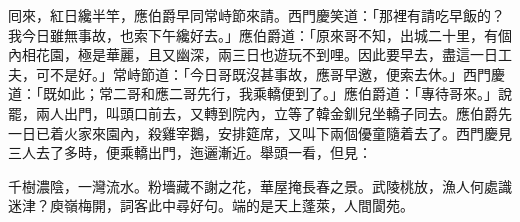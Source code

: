 囘來，紅日纔半竿，應伯爵早同常峙節來請。西門慶笑道：「那裡有請吃早飯的？我今日雖無事故，也索下午纔好去。」應伯爵道：「原來哥不知，出城二十里，有個內相花園，極是華麗，且又幽深，兩三日也遊玩不到哩。因此要早去，盡這一日工夫，可不是好。」常峙節道：「今日哥既沒甚事故，應哥早邀，便索去休。」西門慶道：「既如此；常二哥和應二哥先行，我乘轎便到了。」應伯爵道：「專待哥來。」說罷，兩人出門，叫頭口前去，又轉到院內，立等了韓金釧兒坐轎子同去。應伯爵先一日已着火家來園內，殺雞宰鵝，安排筵席，又叫下兩個優童隨着去了。西門慶見三人去了多時，便乘轎出門，迤邐漸近。舉頭一看，但見：

\begin{myquote}
千樹濃陰，一灣流水。粉墻藏不謝之花，華屋掩長春之景。武陵桃放，漁人何處識迷津？庾嶺梅開，詞客此中尋好句。端的是天上蓬萊，人間閬苑。
\end{myquote}

